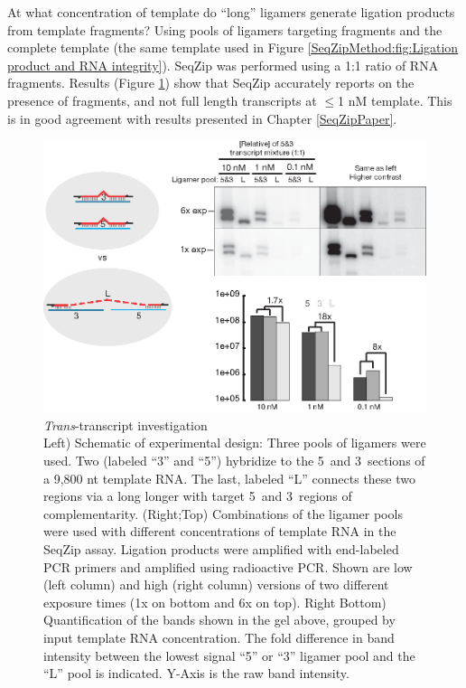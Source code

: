     At what concentration of template do ``long'' ligamers generate ligation products from template fragments? Using pools of ligamers targeting fragments and the complete template (the same template used in Figure \ref{SeqZipMethod:fig:Ligation product and RNA integrity}). SeqZip was performed using a 1:1 ratio of RNA fragments. Results (Figure \ref{SeqZipMethod:fig: trans Tx for degradation}) show that SeqZip accurately reports on the presence of fragments, and not full length transcripts at $\le$1 nM template. This is in good agreement with results presented in Chapter \ref{SeqZipPaper}.

  	\begin{figure} %
    	\centering 
    	\includegraphics{Figures/SeqZipMethod/TransRNAWithSeqZip.eps}
    	\caption[Trans Transcript investigation]
    	{
	      \textit{Trans}-transcript investigation\\[0.25cm]
  	    Left) Schematic of experimental design: Three pools of ligamers were used. Two (labeled ``3'' and ``5'') hybridize to the 5\textprime~and 3\textprime~sections of a 9,800 nt template RNA. The last, labeled ``L'' connects these two regions via a long longer with target 5\textprime~and 3\textprime~regions of complementarity. (Right;Top) Combinations of the ligamer pools were used with different concentrations of template RNA in the SeqZip assay. Ligation products were amplified with end-labeled PCR primers and amplified using radioactive PCR. Shown are low (left column) and high (right column) versions of two different exposure times (1x on bottom and 6x on top). Right Bottom) Quantification of the bands shown in the gel above, grouped by input template RNA concentration. The fold difference in band intensity between the lowest signal ``5'' or ``3'' ligamer pool and the ``L'' pool is indicated. Y-Axis is the raw band intensity.
		    }
   	 \label{SeqZipMethod:fig: trans Tx for degradation}
	 	 \end{figure}

